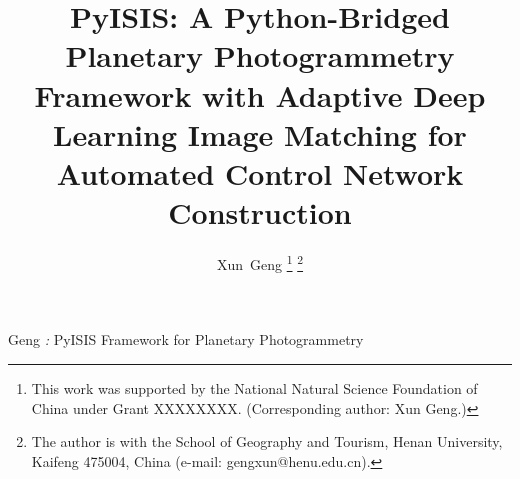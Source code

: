 \documentclass[lettersize,journal]{IEEEtran}
\begin{document}
\title{PyISIS: A Python-Bridged Planetary Photogrammetry Framework with Adaptive Deep Learning Image Matching for Automated Control Network Construction}

\author{Xun~Geng%
\thanks{This work was supported by the National Natural Science Foundation of China under Grant XXXXXXXX. (Corresponding author: Xun Geng.)}%
\thanks{The author is with the School of Geography and Tourism, Henan University, Kaifeng 475004, China (e-mail: gengxun@henu.edu.cn).}
}

%
{Geng \MakeLowercase{\textit{\huge:}} PyISIS Framework for Planetary Photogrammetry}

\maketitle

\end{document}
